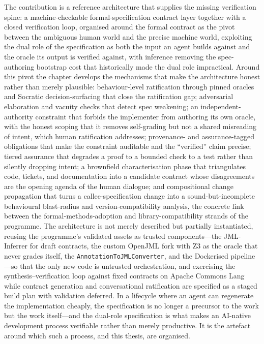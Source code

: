 The contribution is a reference architecture that supplies the missing verification spine: a machine-checkable formal-specification contract layer together with a closed verification loop, organised around the formal contract as the pivot between the ambiguous human world and the precise machine world, exploiting the dual role of the specification as both the input an agent builds against and the oracle its output is verified against, with inference removing the spec-authoring bootstrap cost that historically made the dual role impractical. Around this pivot the chapter develops the mechanisms that make the architecture honest rather than merely plausible: behaviour-level ratification through pinned oracles and Socratic decision-surfacing that close the ratification gap; adversarial elaboration and vacuity checks that detect spec weakening; an independent-authority constraint that forbids the implementer from authoring its own oracle, with the honest scoping that it removes self-grading but not a shared misreading of intent, which human ratification addresses; provenance- and assurance-tagged obligations that make the constraint auditable and the ``verified'' claim precise; tiered assurance that degrades a proof to a bounded check to a test rather than silently dropping intent; a brownfield characterisation phase that triangulates code, tickets, and documentation into a candidate contract whose disagreements are the opening agenda of the human dialogue; and compositional change propagation that turns a callee-specification change into a sound-but-incomplete behavioural blast-radius and version-compatibility analysis, the concrete link between the formal-methods-adoption and library-compatibility strands of the programme. The architecture is not merely described but partially instantiated, reusing the programme's validated assets as trusted components---the JML-Inferrer for draft contracts, the custom OpenJML fork with Z3 as the oracle that never grades itself, the \texttt{AnnotationToJMLConverter}, and the Dockerised pipeline---so that the only new code is untrusted orchestration, and exercising the synthesis--verification loop against fixed contracts on Apache Commons Lang while contract generation and conversational ratification are specified as a staged build plan with validation deferred. In a lifecycle where an agent can regenerate the implementation cheaply, the specification is no longer a precursor to the work but the work itself---and the dual-role specification is what makes an AI-native development process verifiable rather than merely productive. It is the artefact around which such a process, and this thesis, are organised.
